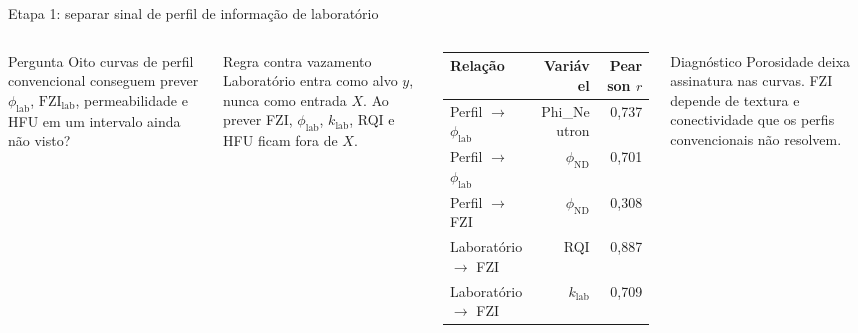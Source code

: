 \documentclass[aspectratio=169,10pt]{beamer}
\newcommand{\philab}{\ensuremath{\phi_{\mathrm{lab}}}}
\newcommand{\fzilab}{\ensuremath{\mathrm{FZI}_{\mathrm{lab}}}}
\newcommand{\phiND}{\ensuremath{\phi_{\mathrm{ND}}}}
\begin{document}
\begin{frame}{Etapa 1: separar sinal de perfil de informa\c{c}\~ao de laborat\'orio}
  \begin{columns}[T,onlytextwidth]
    \footnotesize
    \begin{block}{Pergunta}
      Oito curvas de perfil convencional conseguem prever \philab{},
      \fzilab{}, permeabilidade e HFU em um intervalo ainda n\~ao visto?
    \end{block}
    \begin{exampleblock}{Regra contra vazamento}
      Laborat\'orio entra como alvo $y$, nunca como entrada $X$.
      Ao prever FZI, \philab{}, $k_{\mathrm{lab}}$, RQI e HFU ficam fora
      de $X$.
    \end{exampleblock}
    \centering
    \scriptsize
    \begin{tabular}{lrr}
      \toprule
      Rela\c{c}\~ao & Vari\'avel & Pearson $r$ \\
      \midrule
      Perfil $\rightarrow$ \philab{} & Phi\_Neutron & 0,737 \\
      Perfil $\rightarrow$ \philab{} & \phiND{} & 0,701 \\
      Perfil $\rightarrow$ FZI & \phiND{} & 0,308 \\
      Laborat\'orio $\rightarrow$ FZI & RQI & 0,887 \\
      Laborat\'orio $\rightarrow$ FZI & $k_{\mathrm{lab}}$ & 0,709 \\
      \bottomrule
    \end{tabular}
    \vspace{0.12cm}
    \begin{block}{Diagn\'ostico}
      \scriptsize
      Porosidade deixa assinatura nas curvas. FZI depende de textura e
      conectividade que os perfis convencionais n\~ao resolvem.
    \end{block}
  \end{columns}
\end{frame}
\end{document}
